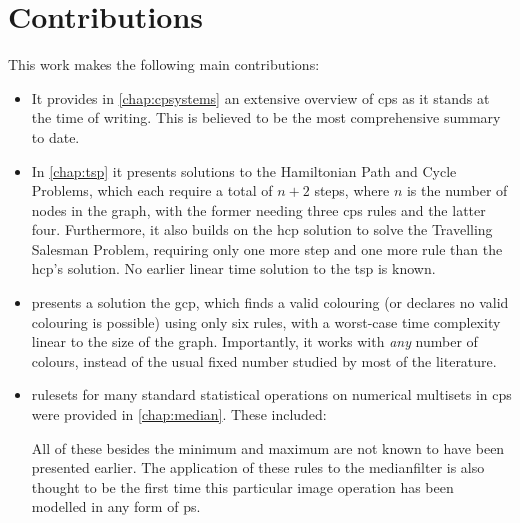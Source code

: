 
\section{Contributions}
This work makes the following main contributions:

\begin{itemize}
    \item It provides in \cref{chap:cpsystems} an extensive overview of \gls{cps} as it stands at the time of writing.  This is believed to be the most comprehensive summary to date.
    \item In \cref{chap:tsp} it presents solutions to the Hamiltonian Path and Cycle Problems, which each require a total of \(n + 2\) steps, where \(n\) is the number of nodes in the graph, with the former needing three \gls{cps} rules and the latter four.  Furthermore, it also builds on the \gls{hcp} solution to solve the Travelling Salesman Problem, requiring only one more step and one more rule than the \gls{hcp}'s solution.  No earlier linear time solution to the \gls{tsp} is known.
    \item {} presents a solution the \gls{gcp}, which finds a valid colouring (or declares no valid colouring is possible) using only six rules, with a worst-case time complexity linear to the size of the graph.  Importantly, it works with \emph{any} number of colours, instead of the usual fixed number studied by most of the literature.
    \item \Glspl{ruleset} for many standard statistical operations on numerical multisets in \gls{cps} were provided in \cref{chap:median}.  These included:
    All of these besides the minimum and maximum are not known to have been presented earlier.  The application of these rules to the \gls{medianfilter} is also thought to be the first time this particular image operation has been modelled in any form of \gls{ps}.

\end{itemize}
